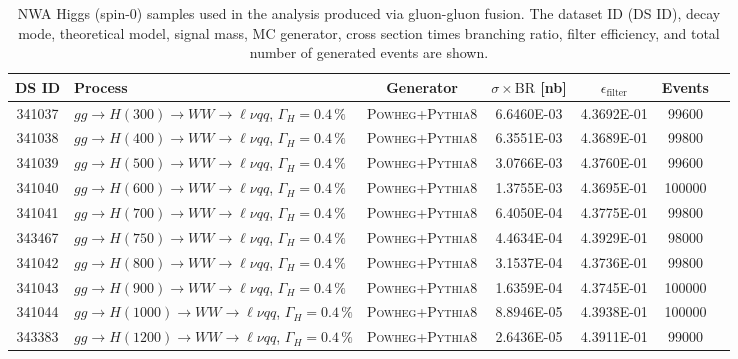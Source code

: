 \begin{landscape}
\begin{table}[!htb]
\caption[Narrow Higgs Monte Carlo samples (gluon-gluon fusion production)]{NWA Higgs (spin-0) samples used in the analysis produced via gluon-gluon fusion. 
The dataset ID (DS ID), decay mode, theoretical model, signal mass, MC generator, cross section times branching ratio, filter efficiency, and total number of generated events are shown.}
\label{tabular:mc_samples_ggFH_NWA}
\begin{footnotesize}
\begin{center}
\begin{tabular}{c|l|c|c|c|cr}
	\hline\hline
	DS ID & Process & Generator & $\sigma\times\text{BR}$ [nb] & $\epsilon_{\text{filter}}$ & Events \\ \hline\hline
	341037 & $gg \to H(300) \to WW \to \ell\nu qq$, $\Gamma_H=0.4\,\%$ & \textsc{Powheg}+\textsc{Pythia8} & 6.6460E-03 & 4.3692E-01 & 99600 \\
	341038 & $gg \to H(400) \to WW \to \ell\nu qq$, $\Gamma_H=0.4\,\%$ & \textsc{Powheg}+\textsc{Pythia8} & 6.3551E-03 & 4.3689E-01 & 99800 \\
	341039 & $gg \to H(500) \to WW \to \ell\nu qq$, $\Gamma_H=0.4\,\%$ & \textsc{Powheg}+\textsc{Pythia8} & 3.0766E-03 & 4.3760E-01 & 99600 \\
	341040 & $gg \to H(600) \to WW \to \ell\nu qq$, $\Gamma_H=0.4\,\%$ & \textsc{Powheg}+\textsc{Pythia8} & 1.3755E-03 & 4.3695E-01 & 100000 \\
	341041 & $gg \to H(700) \to WW \to \ell\nu qq$, $\Gamma_H=0.4\,\%$ & \textsc{Powheg}+\textsc{Pythia8} & 6.4050E-04 & 4.3775E-01 & 99800 \\
	343467 & $gg \to H(750) \to WW \to \ell\nu qq$, $\Gamma_H=0.4\,\%$ & \textsc{Powheg}+\textsc{Pythia8} &  4.4634E-04 & 4.3929E-01 & 98000 \\
	341042 & $gg \to H(800) \to WW \to \ell\nu qq$, $\Gamma_H=0.4\,\%$ & \textsc{Powheg}+\textsc{Pythia8} & 3.1537E-04 & 4.3736E-01 & 99800 \\
	341043 & $gg \to H(900) \to WW \to \ell\nu qq$, $\Gamma_H=0.4\,\%$ & \textsc{Powheg}+\textsc{Pythia8} & 1.6359E-04 & 4.3745E-01 & 100000 \\
	341044 & $gg \to H(1000) \to WW \to \ell\nu qq$, $\Gamma_H=0.4\,\%$ & \textsc{Powheg}+\textsc{Pythia8} & 8.8946E-05 & 4.3938E-01 & 100000 \\
	343383 & $gg \to H(1200) \to WW \to \ell\nu qq$, $\Gamma_H=0.4\,\%$ & \textsc{Powheg}+\textsc{Pythia8} & 2.6436E-05 & 4.3911E-01 &  99000 \\

\end{tabular}
\end{center}
\end{footnotesize}
\end{table}
\end{landscape}
